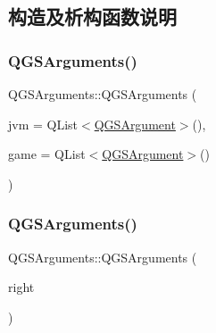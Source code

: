\subsection{构造及析构函数说明}
\mbox{\label{class_q_g_s_arguments_acd1cd222a227b3b63aa5ea58c32f9d1e}} 
\subsubsection{\texorpdfstring{Q\+G\+S\+Arguments()}{QGSArguments()}\hspace{0.1cm}{\footnotesize\ttfamily [1/3]}}
{\footnotesize\ttfamily Q\+G\+S\+Arguments\+::\+Q\+G\+S\+Arguments (\begin{DoxyParamCaption}\item[{const Q\+List$<$ \mbox{\hyperlink{class_q_g_s_arguments_1_1_q_g_s_argument}{Q\+G\+S\+Argument}} $>$ \&}]{jvm = {\ttfamily QList$<$\mbox{\hyperlink{class_q_g_s_arguments_1_1_q_g_s_argument}{Q\+G\+S\+Argument}}$>$()},  }\item[{const Q\+List$<$ \mbox{\hyperlink{class_q_g_s_arguments_1_1_q_g_s_argument}{Q\+G\+S\+Argument}} $>$ \&}]{game = {\ttfamily QList$<$\mbox{\hyperlink{class_q_g_s_arguments_1_1_q_g_s_argument}{Q\+G\+S\+Argument}}$>$()} }\end{DoxyParamCaption})}

\mbox{\label{class_q_g_s_arguments_a3c7e17e049ccb57eb2ecc8039a89c213}} 
\subsubsection{\texorpdfstring{Q\+G\+S\+Arguments()}{QGSArguments()}\hspace{0.1cm}{\footnotesize\ttfamily [2/3]}}
{\footnotesize\ttfamily Q\+G\+S\+Arguments\+::\+Q\+G\+S\+Arguments (\begin{DoxyParamCaption}\item[{const \mbox{\hyperlink{class_q_g_s_arguments}{Q\+G\+S\+Arguments}} \&}]{right }\end{DoxyParamCaption})\hspace{0.3cm}{\ttfamily [default]}}

